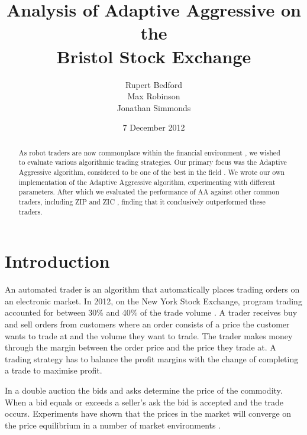 \documentclass[preprint]{acm_proc_article-sp} %
\begin{document}
\title{Analysis of Adaptive Aggressive on the\\
Bristol Stock Exchange}
\author{
  \alignauthor
    Rupert Bedford\\
  \alignauthor
    Max Robinson\\
  \alignauthor
    Jonathan Simmonds
}
\date{7 December 2012}

\maketitle
\begin{abstract}
As robot traders are now commonplace within the financial environment
\cite{nyse_press}, we wished to evaluate various algorithmic trading
strategies. Our primary focus was the  Adaptive Aggressive algorithm,
considered to be one of the best in the field \cite{AA_thesis}. We wrote our
own implementation of the Adaptive Aggressive algorithm, experimenting with
different parameters. After which we evaluated the performance of AA
against other common traders, including ZIP and ZIC \cite{ZIP_paper1}, finding
that it conclusively outperformed these traders.\\
\end{abstract}

\section{Introduction} \label{sec:introduction}

An automated trader is an algorithm that automatically places trading orders on
an electronic market. In 2012, on the New York Stock Exchange, program trading
accounted for between 30\% and 40\% of the trade volume \cite{nyse_press}.  A
trader receives buy and sell orders from customers where an order consists of a
price the customer wants to trade at and the volume they want to trade.  The
trader makes money through the margin between the order price and the price
they trade at.  A trading strategy has to balance the profit margins with the
change of completing a trade to maximise profit.

In a double auction the bids and asks determine the price of the commodity.
When a bid equals or exceeds a seller's ask the bid is accepted and the trade
occurs. Experiments have shown  that the prices in the market will
 converge on the price equilibrium in a number of market
environments \cite{smith_1962}.
\end{document}

